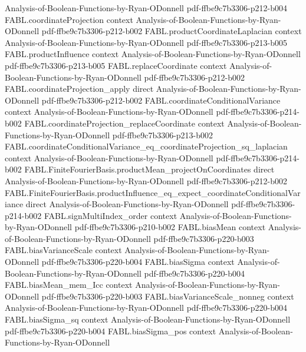 \begin{theorem}
  {Analysis-of-Boolean-Functions-by-Ryan-ODonnell}
  {pdf-ffbe9c7b3306-p212-b004}
\proofstep
  {FABL.coordinateProjection}
  {context}
  {Analysis-of-Boolean-Functions-by-Ryan-ODonnell}
  {pdf-ffbe9c7b3306-p212-b002}
\proofstep
  {FABL.productCoordinateLaplacian}
  {context}
  {Analysis-of-Boolean-Functions-by-Ryan-ODonnell}
  {pdf-ffbe9c7b3306-p213-b005}
\proofstep
  {FABL.productInfluence}
  {context}
  {Analysis-of-Boolean-Functions-by-Ryan-ODonnell}
  {pdf-ffbe9c7b3306-p213-b005}
\proofstep
  {FABL.replaceCoordinate}
  {context}
  {Analysis-of-Boolean-Functions-by-Ryan-ODonnell}
  {pdf-ffbe9c7b3306-p212-b002}
\proofstep
  {FABL.coordinateProjection_apply}
  {direct}
  {Analysis-of-Boolean-Functions-by-Ryan-ODonnell}
  {pdf-ffbe9c7b3306-p212-b002}
\proofstep
  {FABL.coordinateConditionalVariance}
  {context}
  {Analysis-of-Boolean-Functions-by-Ryan-ODonnell}
  {pdf-ffbe9c7b3306-p214-b002}
\proofstep
  {FABL.coordinateProjection_replaceCoordinate}
  {context}
  {Analysis-of-Boolean-Functions-by-Ryan-ODonnell}
  {pdf-ffbe9c7b3306-p213-b002}
\proofstep
  {FABL.coordinateConditionalVariance_eq_coordinateProjection_sq_laplacian}
  {context}
  {Analysis-of-Boolean-Functions-by-Ryan-ODonnell}
  {pdf-ffbe9c7b3306-p214-b002}
\proofstep
  {FABL.FiniteFourierBasis.productMean_projectOnCoordinates}
  {direct}
  {Analysis-of-Boolean-Functions-by-Ryan-ODonnell}
  {pdf-ffbe9c7b3306-p212-b002}
\proofstep
  {FABL.FiniteFourierBasis.productInfluence_eq_expect_coordinateConditionalVariance}
  {direct}
  {Analysis-of-Boolean-Functions-by-Ryan-ODonnell}
  {pdf-ffbe9c7b3306-p214-b002}
\proofstep
  {FABL.signMultiIndex_order}
  {context}
  {Analysis-of-Boolean-Functions-by-Ryan-ODonnell}
  {pdf-ffbe9c7b3306-p210-b002}
\proofstep
  {FABL.biasMean}
  {context}
  {Analysis-of-Boolean-Functions-by-Ryan-ODonnell}
  {pdf-ffbe9c7b3306-p220-b003}
\proofstep
  {FABL.biasVarianceScale}
  {context}
  {Analysis-of-Boolean-Functions-by-Ryan-ODonnell}
  {pdf-ffbe9c7b3306-p220-b004}
\proofstep
  {FABL.biasSigma}
  {context}
  {Analysis-of-Boolean-Functions-by-Ryan-ODonnell}
  {pdf-ffbe9c7b3306-p220-b004}
\proofstep
  {FABL.biasMean_mem_Icc}
  {context}
  {Analysis-of-Boolean-Functions-by-Ryan-ODonnell}
  {pdf-ffbe9c7b3306-p220-b003}
\proofstep
  {FABL.biasVarianceScale_nonneg}
  {context}
  {Analysis-of-Boolean-Functions-by-Ryan-ODonnell}
  {pdf-ffbe9c7b3306-p220-b004}
\proofstep
  {FABL.biasSigma_sq}
  {context}
  {Analysis-of-Boolean-Functions-by-Ryan-ODonnell}
  {pdf-ffbe9c7b3306-p220-b004}
\proofstep
  {FABL.biasSigma_pos}
  {context}
  {Analysis-of-Boolean-Functions-by-Ryan-ODonnell}

\end{theorem}
